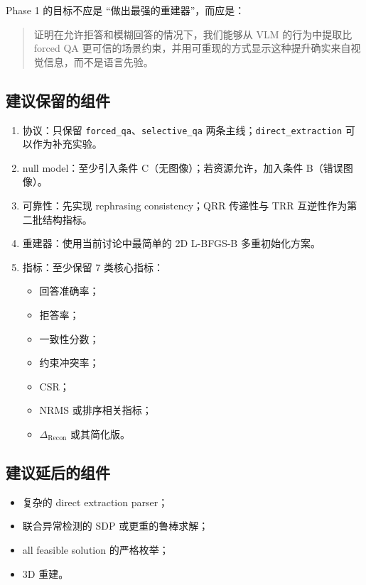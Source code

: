 \documentclass[11pt,a4paper]{ctexart}
\begin{document}
Phase 1 的目标不应是 ``做出最强的重建器''，而应是：
\begin{quote}
证明在允许拒答和模糊回答的情况下，我们能够从 VLM 的行为中提取比 forced QA 更可信的场景约束，并用可重现的方式显示这种提升确实来自视觉信息，而不是语言先验。
\end{quote}

\subsection{建议保留的组件}

\begin{enumerate}[label=\arabic*.]
  \item 协议：只保留 \texttt{forced\_qa}、\texttt{selective\_qa} 两条主线；\texttt{direct\_extraction} 可以作为补充实验。
  \item null model：至少引入条件 C（无图像）；若资源允许，加入条件 B（错误图像）。
  \item 可靠性：先实现 rephrasing consistency；QRR 传递性与 TRR 互逆性作为第二批结构指标。
  \item 重建器：使用当前讨论中最简单的 2D L-BFGS-B 多重初始化方案。
  \item 指标：至少保留 7 类核心指标：
  \begin{itemize}
    \item 回答准确率；
    \item 拒答率；
    \item 一致性分数；
    \item 约束冲突率；
    \item CSR；
    \item NRMS 或排序相关指标；
    \item $\Delta_{\mathrm{Recon}}$ 或其简化版。
  \end{itemize}
\end{enumerate}

\subsection{建议延后的组件}

\begin{itemize}
  \item 复杂的 direct extraction parser；
  \item 联合异常检测的 SDP 或更重的鲁棒求解；
  \item all feasible solution 的严格枚举；
  \item 3D 重建。
\end{itemize}
\end{document}
